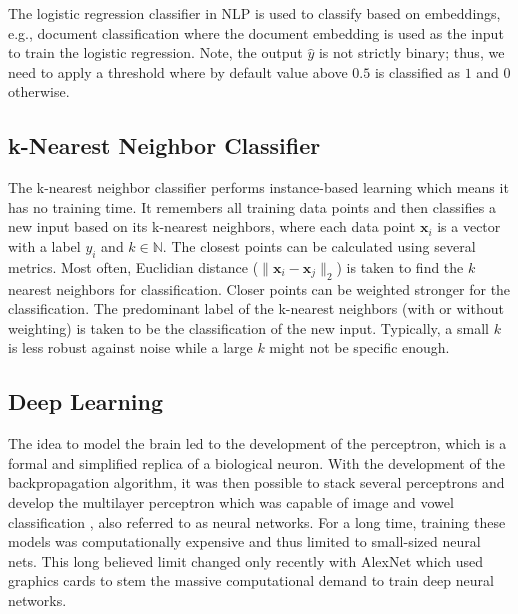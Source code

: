   The logistic regression classifier in NLP is used to classify based on embeddings, e.g., document classification where the document embedding is used as the input to train the logistic regression.
  Note, the output $\hat{y}$ is not strictly binary; thus, we need to apply a threshold where by default value above $0.5$ is classified as $1$ and $0$ otherwise.

\subsection{k-Nearest Neighbor Classifier}
  The k-nearest neighbor classifier performs instance-based learning which means it has no training time.
  It remembers all training data points and then classifies a new input based on its k-nearest neighbors, where each data point $\mathbf{x}_i$ is a vector with a label $y_i$ and $k \in \mathbb{N}$.
  The closest points can be calculated using several metrics.
  Most often, Euclidian distance ($\| \mathbf{x}_i - \mathbf{x}_j\|_2$) is taken to find the $k$ nearest neighbors for classification.
  Closer points can be weighted stronger for the classification.
  The predominant label of the k-nearest neighbors (with or without weighting) is taken to be the classification of the new input.
  Typically, a small $k$ is less robust against noise while a large $k$ might not be specific enough.

\subsection{Deep Learning}
  The idea to model the brain led to the development of the perceptron, which is a formal and simplified replica of a biological neuron.
  With the development of the backpropagation algorithm, it was then possible to stack several perceptrons and develop the multilayer perceptron which was capable of image and vowel classification \citep{Russell2009}, also referred to as neural networks.
  For a long time, training these models was computationally expensive and thus limited to small-sized neural nets.
  This long believed limit changed only recently with AlexNet \citep{Krizhevsky2012} which used graphics cards to stem the massive computational demand to train deep neural networks.

